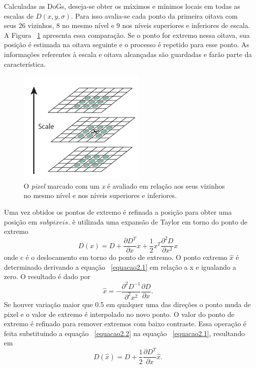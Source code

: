 Calculadas as DoGs, deseja-se obter os máximos e mínimos locais em todas as escalas de $\textit{D}(x,y,\sigma)$. Para isso avalia-se cada ponto da primeira oitava com seus 26 vizinhos, 8 no mesmo nível e 9 nos níveis superiores e inferiores de escala. A Figura ~\ref{fig:pixelcamadas} apresenta essa comparação. Se o ponto for extremo nessa oitava, sua posição é estimada na oitava seguinte e o processo é repetido para esse ponto. As informações referentes à escala e oitava alcançadas são guardadas e farão parte da característica. 


\begin{figure}[h!]
	\centering
	\includegraphics[width=0.5\linewidth]{figures/pixelCamadas}
	\caption{O \textit{pixel} marcado com um \textit{x} é avaliado em relação aos seus vizinhos no mesmo nível e nos níveis superiores e inferiores. \cite{VisualOdometryRodasVehicles}}
	\label{fig:pixelcamadas}
\end{figure}

Uma vez obtidos os pontos de extremo é refinada a posição para obter uma posição em $\textit{subpixeis}$. è utilizada uma expansão de Taylor em torno do ponto de extremo \begin{equation}\label{equacao2.1}
 D(x) = D + \frac{\partial D^T}{\partial x}x + \frac{1}{2}x^T\frac{\partial^2D}{\partial x^2}x
 \end{equation} onde c é o deslocamento em torno do ponto de extremo. O ponto extremo $\hat{x}$ é determinado derivando a equação ~\ref{equacao2.1} em relação a x e igualando a zero. O resultado é dado por \begin{equation}\label{equacao2.2}
 \hat{x} = -\frac{\partial^2D^{-1}}{\partial^2x^2}\frac{\partial D}{\partial x}. 
\end{equation} 
Se houver variação maior que 0.5 em qualquer uma das direções o ponto muda de pixel e o valor de extremo é interpolado no novo ponto. O valor do ponto de extremo é refinado para remover extremos com baixo contraste. Essa operação é feita substituindo a equação ~\ref{equacao2.2} na equação ~\ref{equacao2.1}, resultando em \[ D( \hat{x} ) = D + \frac{1}{2}\frac{\partial D^T}{\partial x} \hat{x} . \]

